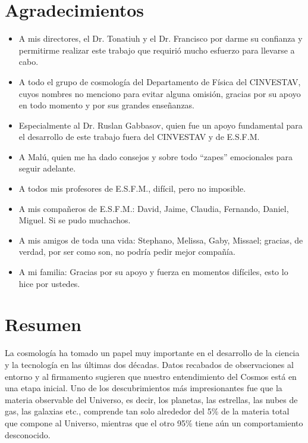 \documentclass[a4paper,openright,12pt]{book}
\begin{document}
\chapter*{Agradecimientos} %
\begin{itemize}
\item A mis directores, el Dr. Tonatiuh y el Dr. Francisco por darme su confianza y permitirme realizar este trabajo que requirió mucho esfuerzo para llevarse a cabo.
\item A todo el grupo de cosmología del Departamento de Física del CINVESTAV, cuyos nombres no menciono para evitar alguna omisión, gracias por su apoyo en todo momento y por sus grandes enseñanzas.
\item Especialmente al Dr. Ruslan Gabbasov, quien fue un apoyo fundamental para el desarrollo de este trabajo fuera del CINVESTAV y de E.S.F.M.
\item A Malú, quien me ha dado consejos y sobre todo ``zapes'' emocionales para seguir adelante.
\item A todos mis profesores de E.S.F.M., difícil, pero no imposible.
\item A mis compañeros de E.S.F.M.: David, Jaime, Claudia, Fernando, Daniel, Miguel. Si se pudo muchachos.
\item A mis amigos de toda una vida: Stephano, Melissa, Gaby, Missael; gracias, de verdad, por ser como son, no podría pedir mejor compañía.
\item A mi familia: Gracias por su apoyo y fuerza en momentos difíciles, esto lo hice por ustedes.
\end{itemize}



\chapter*{Resumen} %
La cosmología ha tomado un papel muy importante en el desarrollo de la ciencia y la tecnología en las últimas dos décadas. Datos recabados de observaciones al entorno y al firmamento sugieren que nuestro entendimiento del Cosmos está en una etapa inicial. Uno de los descubrimientos más impresionantes fue que la materia observable del Universo, es decir, los planetas, las estrellas, las nubes de gas, las galaxias etc., comprende tan solo alrededor del 5\% de la materia total que compone al Universo, mientras que el otro 95\% tiene aún un comportamiento desconocido.
\end{document}
